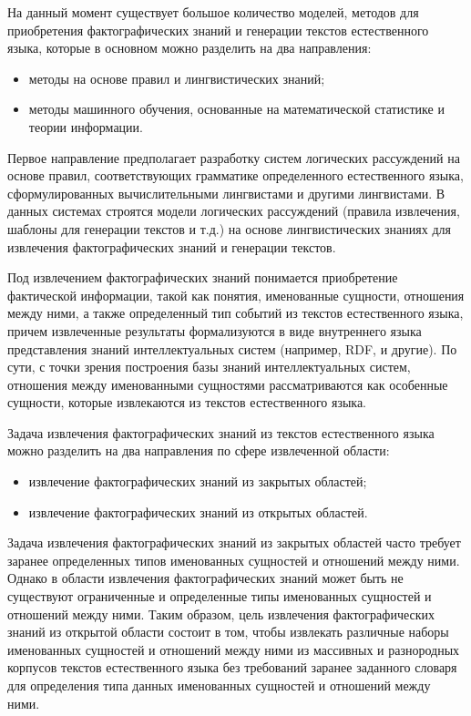 На данный момент существует большое количество моделей, методов для приобретения фактографических знаний и генерации текстов естественного языка, которые в основном можно разделить на два направления:
\begin{itemize}
	\item методы на основе правил и лингвистических знаний;
	\item методы машинного обучения, основанные на математической статистике и теории информации.
\end{itemize}

Первое направление предполагает разработку систем логических рассуждений на основе правил, соответствующих грамматике определенного естественного языка, сформулированных вычислительными лингвистами и другими лингвистами. В данных системах строятся модели логических рассуждений (правила извлечения, шаблоны для генерации текстов и т.д.) на основе лингвистических знаниях для извлечения фактографических знаний и генерации текстов. 

Под извлечением фактографических знаний понимается приобретение фактической информации, такой как понятия, именованные сущности, отношения между ними, а также определенный тип событий из текстов естественного языка, причем извлеченные результаты формализуются в виде внутреннего языка представления знаний интеллектуальных систем (например, RDF,  и другие). По сути, с точки зрения построения базы знаний интеллектуальных систем, отношения между именованными сущностями рассматриваются как особенные сущности, которые извлекаются из текстов естественного языка. 

Задача извлечения фактографических знаний из текстов естественного языка можно разделить на два направления по сфере извлеченной области:
\begin{itemize}
	\item извлечение фактографических знаний из закрытых областей;
	\item извлечение фактографических знаний из открытых областей.
\end{itemize}

Задача извлечения фактографических знаний из закрытых областей часто требует заранее определенных типов именованных сущностей и отношений между ними. Однако в области извлечения фактографических знаний может быть не существуют ограниченные и определенные типы именованных сущностей и отношений между ними. Таким образом, цель извлечения фактографических знаний из открытой области состоит в том, чтобы извлекать различные наборы именованных сущностей и отношений между ними из массивных и разнородных корпусов текстов естественного языка без требований заранее заданного словаря для определения типа данных именованных сущностей и отношений между ними.

